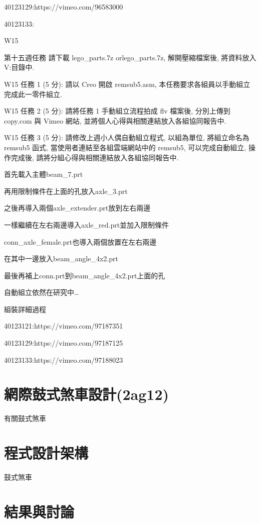 \documentclass[]{article}
\begin{document}
40123129:https://vimeo.com/96583000

40123133:

W15

第十五週任務 請下載 lego\_parts.7z orlego\_parts.7z, 解開壓縮檔案後,
將資料放入 V:\home\lego 目錄中.

W15 任務 1 (5 分): 請以 Creo 開啟 remsub5.asm,
本任務要求各組員以手動組立完成此一零件組立.

W15 任務 2 (5 分): 請將任務 1 手動組立流程拍成 flv 檔案後, 分別上傳到
copy.com 與 Vimeo 網站, 並將個人心得與相關連結放入各組協同報告中.

W15 任務 3 (5 分): 請修改上週小人偶自動組立程式, 以組為單位,
將組立命名為 remsub5 函式, 當使用者連結至各組雲端網站中的 remsub5,
可以完成自動組立, 操作完成後, 請將分組心得與相關連結放入各組協同報告中.

首先載入主體beam\_7.prt

再用限制條件在上面的孔放入axle\_3.prt

之後再導入兩個axle\_extender.prt放到左右兩邊

一樣繼續在左右兩邊導入axle\_red.prt並加入限制條件

conn\_axle\_female.prt也導入兩個放置在左右兩邊

在其中一邊放入beam\_angle\_4x2.prt

最後再補上conn.prt到beam\_angle\_4x2.prt上面的孔

自動組立依然在研究中\ldots{}

組裝詳細過程

40123121:https://vimeo.com/97187351

40123129:https://vimeo.com/97187125

40123133:https://vimeo.com/97188023

\section{網際鼓式煞車設計(2ag12)}\label{ux7db2ux969bux9f13ux5f0fux715eux8ecaux8a2dux8a082ag12}

有關鼓式煞車

\section{程式設計架構}\label{ux7a0bux5f0fux8a2dux8a08ux67b6ux69cb-1}

鼓式煞車

\section{結果與討論}\label{ux7d50ux679cux8207ux8a0eux8ad6-1}
\end{document}
